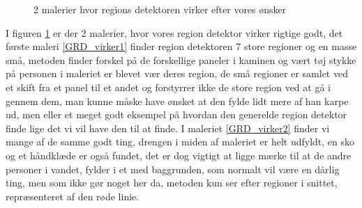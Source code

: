 \begin{figure}[!h]
{        	\label{GRD_virker1}}\hspace{1em}
		\hspace{1em}
        \caption[]{2 malerier hvor regions detektoren virker efter vores ønsker}
     \label{generelde_region_detektor_virker}
\end{figure}

I figuren \ref{generelde_region_detektor_virker} er der 2 malerier, hvor
vores region detektor virker rigtige godt, det første maleri
\ref{GRD_virker1} finder region detektoren 7 store regioner og en masse
små, metoden finder forskel på de forskellige paneler i kaminen og vært
tøj stykke på personen i maleriet er blevet vær deres region, de små
regioner er samlet ved et skift fra et panel til et andet og forstyrrer
ikke de store region ved at gå i gennem dem, man kunne måske have ønsket
at den fylde lidt mere af han karpe ud, men eller et meget godt eksempel
på hvordan den generelde region detektor finde lige det vi vil have den
til at finde. I maleriet \ref{GRD_virker2} finder vi mange af de samme
godt ting, drengen i miden af maleriet er helt udfyldt, en sko og et
håndklæde er også fundet, det er dog vigtigt at ligge mærke til at de
andre personer i vandet, fylder i et med baggrunden, som normalt vil
være en dårlig ting, men som ikke gør noget her da, metoden kun ser
efter regioner i snittet, repræsenteret af den røde linie.
 
